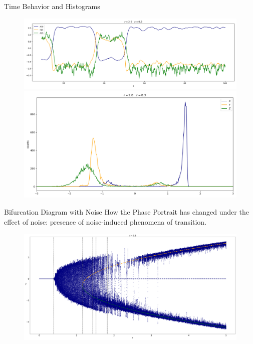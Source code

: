 \documentclass[10pt]{beamer}
\begin{document}
\begin{frame}{Time Behavior and Histograms}
	\begin{figure}
		\includegraphics[width=\textwidth, height=0.52\textheight,keepaspectratio]{./figures_2/r2-eps0.3-time-trajectories.png}
		\includegraphics[width=\textwidth, height=0.52\textheight,keepaspectratio]{./figures_2/r2-eps0.3-hist.png}
	\end{figure}
\end{frame}

\begin{frame}{Bifurcation Diagram with Noise}
	How the Phase Portrait has changed under the effect of noise: presence of noise-induced phenomena of transition.
	\begin{figure}
	\includegraphics[width=\textwidth, height=\textheight,keepaspectratio]{figures_2/eps0.3-phase-portrait.png}
	\end{figure}
\end{frame}
\end{document}
